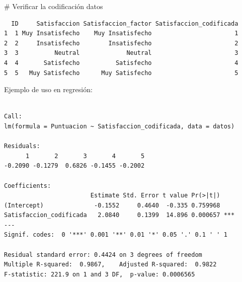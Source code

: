 \documentclass[
  letterpaper,
  DIV=11,
  numbers=noendperiod]{scrreprt}
\newenvironment{Shaded}{\begin{snugshade}}{\end{snugshade}}
\newcommand{\AttributeTok}[1]{\textcolor[rgb]{0.40,0.45,0.13}{#1}}
\newcommand{\CommentTok}[1]{\textcolor[rgb]{0.37,0.37,0.37}{#1}}
\newcommand{\DecValTok}[1]{\textcolor[rgb]{0.68,0.00,0.00}{#1}}
\newcommand{\FloatTok}[1]{\textcolor[rgb]{0.68,0.00,0.00}{#1}}
\newcommand{\FunctionTok}[1]{\textcolor[rgb]{0.28,0.35,0.67}{#1}}
\newcommand{\NormalTok}[1]{\textcolor[rgb]{0.00,0.23,0.31}{#1}}
\newcommand{\OtherTok}[1]{\textcolor[rgb]{0.00,0.23,0.31}{#1}}
\newcommand{\SpecialCharTok}[1]{\textcolor[rgb]{0.37,0.37,0.37}{#1}}
\begin{document}
\begin{tcolorbox}
\begin{Shaded}
\begin{Highlighting}[]
\CommentTok{\# Verificar la codificación}
\NormalTok{datos}
\end{Highlighting}
\end{Shaded}

\begin{verbatim}
  ID     Satisfaccion Satisfaccion_factor Satisfaccion_codificada
1  1 Muy Insatisfecho    Muy Insatisfecho                       1
2  2     Insatisfecho        Insatisfecho                       2
3  3          Neutral             Neutral                       3
4  4       Satisfecho          Satisfecho                       4
5  5   Muy Satisfecho      Muy Satisfecho                       5
\end{verbatim}

Ejemplo de uso en regresión:

\begin{Shaded}
\end{Shaded}

\begin{verbatim}

Call:
lm(formula = Puntuacion ~ Satisfaccion_codificada, data = datos)

Residuals:
      1       2       3       4       5 
-0.2090 -0.1279  0.6826 -0.1455 -0.2002 

Coefficients:
                        Estimate Std. Error t value Pr(>|t|)    
(Intercept)              -0.1552     0.4640  -0.335 0.759968    
Satisfaccion_codificada   2.0840     0.1399  14.896 0.000657 ***
---
Signif. codes:  0 '***' 0.001 '**' 0.01 '*' 0.05 '.' 0.1 ' ' 1

Residual standard error: 0.4424 on 3 degrees of freedom
Multiple R-squared:  0.9867,    Adjusted R-squared:  0.9822 
F-statistic: 221.9 on 1 and 3 DF,  p-value: 0.0006565
\end{verbatim}

\end{tcolorbox}
\end{document}
